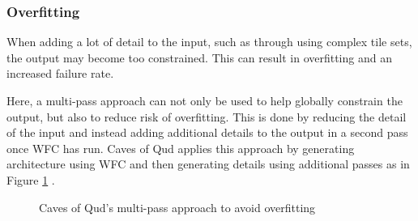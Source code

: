 \subsubsection{Overfitting}
When adding a lot of detail to the input, such as through using complex tile sets, the output may become too constrained. This can result in overfitting and an increased failure rate.

Here, a multi-pass approach can not only be used to help globally constrain the output, but also to reduce risk of overfitting. This is done by reducing the detail of the input and instead adding additional details to the output in a second pass once WFC has run. Caves of Qud applies this approach by generating architecture using WFC and then generating details using additional passes as in Figure \ref{fig:cavesOfQudWFCOverfitting} \cite{GDC_caves_of_qud}.

\begin{figure}[H]
    \centering
    \hfill
    \caption{Caves of Qud's multi-pass approach to avoid overfitting \cite{GDC_caves_of_qud}}
    \label{fig:cavesOfQudWFCOverfitting}
\end{figure}

